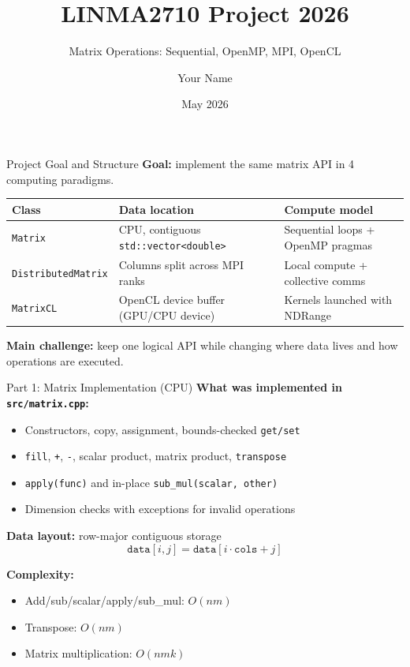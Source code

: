 \documentclass[aspectratio=169]{beamer}
\title{LINMA2710 Project 2026}
\subtitle{Matrix Operations: Sequential, OpenMP, MPI, OpenCL}
\author{Your Name}
\institute{UCLouvain}
\date{May 2026}
\begin{document}
\begin{frame}
  \titlepage
\end{frame}

\begin{frame}{Project Goal and Structure}
\textbf{Goal:} implement the same matrix API in 4 computing paradigms.

\vspace{0.3cm}
\begin{tabular}{@{}p{2.7cm}p{5.1cm}p{4.2cm}@{}}
\toprule
Class & Data location & Compute model \\
\midrule
\texttt{Matrix} & CPU, contiguous \texttt{std::vector<double>} & Sequential loops + OpenMP pragmas \\
\texttt{DistributedMatrix} & Columns split across MPI ranks & Local compute + collective comms \\
\texttt{MatrixCL} & OpenCL device buffer (GPU/CPU device) & Kernels launched with NDRange \\
\bottomrule
\end{tabular}

\vspace{0.35cm}
\textbf{Main challenge:} keep one logical API while changing where data lives and how operations are executed.
\end{frame}

\begin{frame}{Part 1: Matrix Implementation (CPU)}
\textbf{What was implemented in \texttt{src/matrix.cpp}:}
\begin{itemize}
  \item Constructors, copy, assignment, bounds-checked \texttt{get/set}
  \item \texttt{fill}, \texttt{+}, \texttt{-}, scalar product, matrix product, \texttt{transpose}
  \item \texttt{apply(func)} and in-place \texttt{sub\_mul(scalar, other)}
  \item Dimension checks with exceptions for invalid operations
\end{itemize}

\textbf{Data layout:} row-major contiguous storage
\[
\texttt{data}[i,j] = \texttt{data}[i \cdot \texttt{cols} + j]
\]

\textbf{Complexity:}
\begin{itemize}
  \item Add/sub/scalar/apply/sub\_mul: $O(nm)$
  \item Transpose: $O(nm)$
  \item Matrix multiplication: $O(nmk)$
\end{itemize}
\end{frame}
\end{document}
